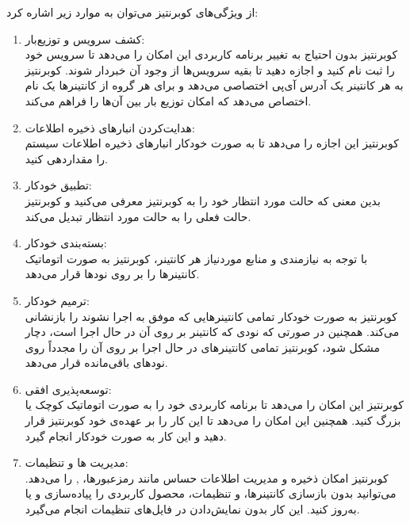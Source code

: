 از ویژگی‌های کوبرنتیز می‌توان به موارد زیر اشاره کرد:
\begin{enumerate}
	\item 
	کشف سرویس و توزیع‌بار:\\
	کوبرنتیز بدون احتیاج به تغییر برنامه کاربردی این امکان را می‌دهد تا سرویس خود را ثبت نام کنید و اجازه دهید تا بقیه سرویس‌ها از وجود آن خبردار شوند. کوبرنتیز به هر کانتینر یک آدرس آی‌پی اختصاصی می‌دهد و برای هر گروه از کانتینرها یک نام  اختصاص می‌دهد که امکان توزیع بار بین آن‌ها را فراهم می‌کند.
	\item 
	هدایت‌کردن انبارهای ذخیره اطلاعات:\\
	کوبرنتیز این اجازه را می‌دهد تا به صورت خودکار انبارهای ذخیره اطلاعات سیستم را مقداردهی کنید.
	\item 
	تطبیق خودکار:\\
	بدین معنی که حالت مورد انتظار خود را به کوبرنتیز معرفی می‌کنید و کوبرنتیز حالت فعلی را به حالت مورد انتظار تبدیل می‌کند.
	
	\item
	بسته‌بندی خودکار:\\
	با توجه به نیازمندی و منابع مورد‌نیاز هر کانتینر، کوبرنتیز به صورت اتوماتیک کانتینرها را بر روی نود‌ها قرار می‌دهد.
	\item
	ترمیم خودکار:\\
	کوبرنتیز به صورت خودکار تمامی کانتینرهایی که موفق به اجرا نشوند را بازنشانی می‌کند. همچنین در صورتی که نودی که کانتینر بر روی آن در حال اجرا است، دچار مشکل شود، کوبرنتیز تمامی کانتینرهای در حال اجرا بر روی آن را مجدداً روی نود‌های باقی‌مانده قرار می‌دهد.
	\item
	توسعه‌پذیری افقی:\\
	کوبرنتیز این امکان را می‌دهد تا برنامه کاربردی خود را به صورت اتوماتیک کوچک یا بزرگ کنید. همچنین این امکان را می‌دهد تا این کار را بر عهده‌ی خود کوبرنتیز قرار دهید و این کار به صورت خودکار انجام گیرد.
	
	\item
	مدیریت 
	ها و تنظیمات:\\
	کوبرنتیز امکان ذخیره و مدیریت اطلاعات حساس مانند رمز‌عبورها، 
	, 
	را می‌دهد. می‌توانید بدون بازسازی کانتینرها، 
	و تنظیمات، محصول کاربردی را پیاده‌سازی و یا به‌روز کنید. این کار بدون نمایش‌دادن 
	در فایل‌های تنظیمات انجام می‌گیرد.
	
\end{enumerate}

